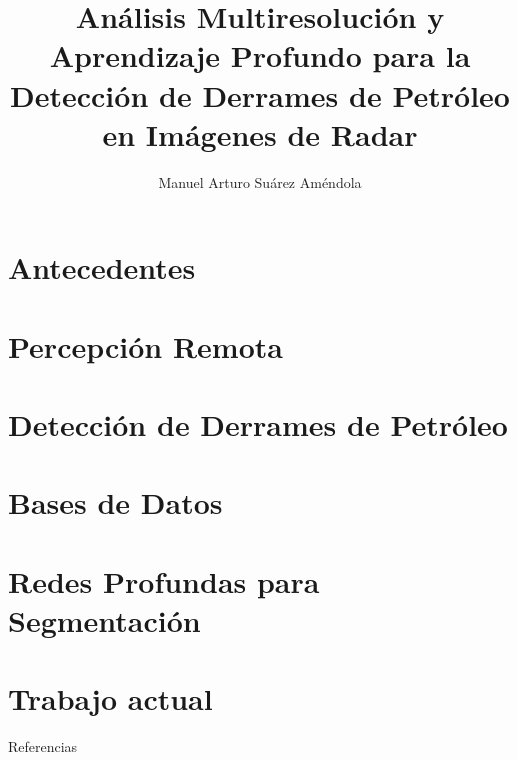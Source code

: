 \documentclass[11pt]{beamer}
\title[CIMAT - UAM I]
{Análisis Multiresolución y Aprendizaje Profundo para la Detección de Derrames de Petróleo en Imágenes de Radar}
\author[Suárez, Arturo]{Manuel Arturo Suárez Améndola}
\begin{document}


\section{Antecedentes}


\section{Percepción Remota}


\section{Detección de Derrames de Petróleo}


\section{Bases de Datos}


\section{Redes Profundas para Segmentación}


%

\section{Trabajo actual}


\nocite{*}
\begin{frame}[allowframebreaks]{Referencias}


\end{frame}
\end{document}
